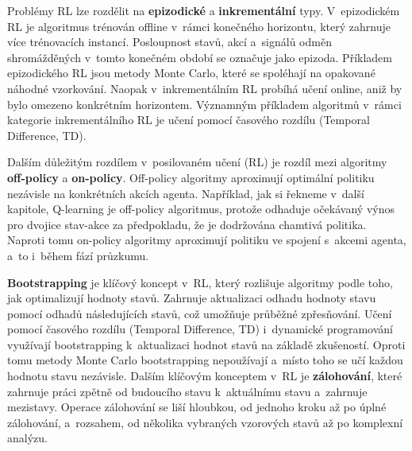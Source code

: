 Problémy RL lze rozdělit na \textbf{epizodické} a \textbf{inkrementální} typy. V~epizodickém RL je algoritmus trénován offline v~rámci konečného horizontu, který zahrnuje více trénovacích instancí. Posloupnost stavů, akcí a~signálů odměn shromážděných v~tomto konečném období se označuje jako epizoda. Příkladem epizodického RL jsou metody Monte Carlo, které se spoléhají na opakované náhodné vzorkování. Naopak v~inkrementálním RL probíhá učení online, aniž by bylo omezeno konkrétním horizontem. Významným příkladem algoritmů v~rámci kategorie inkrementálního RL je učení pomocí časového rozdílu (Temporal Difference, TD).

\newpage

Dalším důležitým rozdílem v~posilovaném učení (RL) je rozdíl mezi algoritmy \textbf{off-policy} a \textbf{on-policy}. Off-policy algoritmy aproximují optimální politiku nezávisle na konkrétních akcích agenta. Například, jak si řekneme v~další kapitole, Q-learning je off-policy algoritmus, protože odhaduje očekávaný výnos pro dvojice stav-akce za předpokladu, že je dodržována chamtivá politika. Naproti tomu on-policy algoritmy aproximují politiku ve spojení s~akcemi agenta, a~to i~během fází průzkumu.

\textbf{Bootstrapping} je klíčový koncept v~RL, který rozlišuje algoritmy podle toho, jak optimalizují hodnoty stavů. Zahrnuje aktualizaci odhadu hodnoty stavu pomocí odhadů následujících stavů, což umožňuje průběžné zpřesňování. Učení pomocí časového rozdílu (Temporal Difference, TD) i~dynamické programování využívají bootstrapping k~aktualizaci hodnot stavů na základě zkušeností. Oproti tomu metody Monte Carlo bootstrapping nepoužívají a~místo toho se učí každou hodnotu stavu nezávisle. Dalším klíčovým konceptem v~RL je \textbf{zálohování}, které zahrnuje práci zpětně od budoucího stavu k~aktuálnímu stavu a~zahrnuje mezistavy. Operace zálohování se liší hloubkou, od jednoho kroku až po úplné zálohování, a~rozsahem, od několika vybraných vzorových stavů až po komplexní analýzu.

